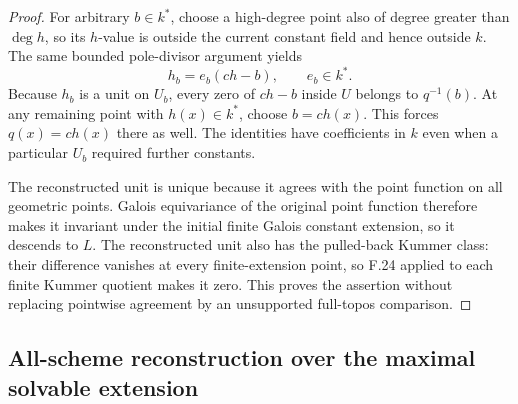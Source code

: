 \begin{proof}
For arbitrary $b\in k^*$, choose a high-degree point also of
degree greater than $\deg h$, so its $h$-value is outside the
current constant field and hence outside $k$. The same bounded
pole-divisor argument yields
\[
 h_b=e_b(ch-b),\qquad e_b\in k^*.
\]
Because $h_b$ is a unit on $U_b$, every zero of $ch-b$ inside
$U$ belongs to $q^{-1}(b)$. At any remaining point with
$h(x)\in k^*$, choose $b=ch(x)$. This forces $q(x)=ch(x)$
there as well. The identities have coefficients in $k$ even
when a particular $U_b$ required further constants.

The reconstructed unit is unique because it agrees with the
point function on all geometric points. Galois equivariance of
the original point function therefore makes it invariant under
the initial finite Galois constant extension, so it descends
to $L$. The reconstructed unit also has the pulled-back Kummer
class: their difference vanishes at every finite-extension point,
so F.24 applied to each finite Kummer quotient makes it zero.
This proves the assertion without replacing pointwise
agreement by an unsupported full-topos comparison.
\end{proof}

\subsection{All-scheme reconstruction over the maximal solvable extension}

